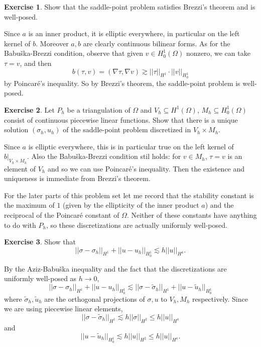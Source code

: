 \documentclass[10pt]{article}
\theoremstyle{definition}
\newtheorem{exer}{Exercise}
\begin{document}
\begin{exer}
Show that the saddle-point problem satisfies Brezzi's theorem and is well-posed.
\end{exer}

Since $a$ is an inner product, it is elliptic everywhere, in particular on the left kernel of $b$.
Moreover $a, b$ are clearly continuous bilinear forms.
As for the Babuška-Brezzi condition, observe that given $v \in H^1_0(\Omega)$ nonzero, we can take $\tau = v$, and then 
$$b(\tau, v) = (\nabla \tau, \nabla v) \gtrsim ||\tau||_{H^1} \cdot ||v||_{H^1_0}$$
by Poincar\'e's inequality.
So by Brezzi's theorem, the saddle-point problem is well-posed.

\begin{exer}
Let $P_h$ be a triangulation of $\Omega$ and $V_h \subseteq H^1(\Omega)$, $M_h \subseteq H^1_0(\Omega)$ consist of continuous piecewise linear functions.
Show that there is a unique solution $(\sigma_h, u_h)$ of the saddle-point problem discretized in $V_h \times M_h$.
\end{exer}

Since $a$ is elliptic everywhere, this is in particular true on the left kernel of $b|_{V_h \times M_h}$.
Also the Babuška-Brezzi condition stil holds: for $v \in M_h$, $\tau = v$ is an element of $V_h$ and so we can use Poincar\'e's inequality.
Then the existence and uniqueness is immediate from Brezzi's theorem.

For the later parts of this problem set let me record that the stability constant is the maximum of $1$ (given by the ellipticity of the inner product $a$) and the reciprocal of the Poincar\'e constant of $\Omega$.
Neither of these constants have anything to do with $P_h$, so these discretizations are actually uniformly well-posed.

\begin{exer}
Show that 
$$||\sigma - \sigma_h||_{H^1} + ||u - u_h||_{H^1_0} \lesssim h||u||_{H^4}.$$
\end{exer}

By the Aziz-Babuška inequality and the fact that the discretizations are uniformly well-posed as $h \to 0$,
$$||\sigma - \sigma_h||_{H^1} + ||u - u_h||_{H^1_0} \lesssim ||\sigma - \tilde \sigma_h||_{H^1} + ||u - \tilde u_h||_{H^1_0}$$
where $\tilde \sigma_h, \tilde u_h$ are the orthogonal projections of $\sigma, u$ to $V_h, M_h$ respectively.
Since we are using piecewise linear elements,
$$||\sigma - \tilde \sigma_h||_{H^1} \lesssim h ||\sigma||_{H^2} \leq h ||u||_{H^4}$$
and 
$$||u - \tilde u_h||_{H^1_0} \lesssim h ||u||_{H^2} \leq h ||u||_{H^4}.$$
\end{document}
